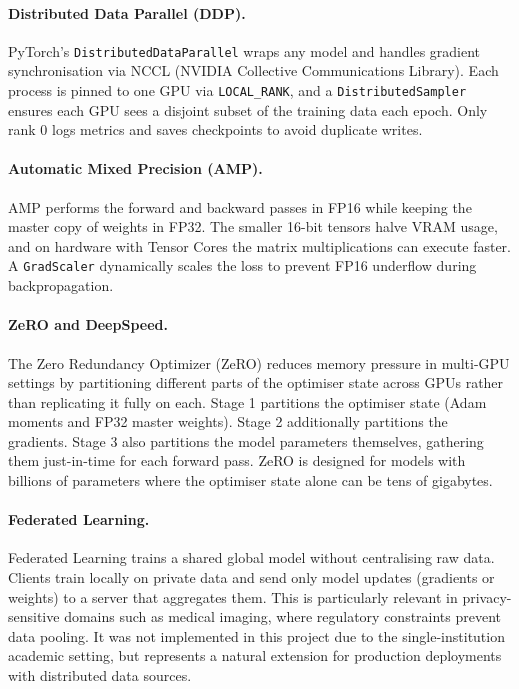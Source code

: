 \paragraph{Distributed Data Parallel (DDP).}
PyTorch's \texttt{DistributedDataParallel} wraps any model and handles
gradient synchronisation via NCCL (NVIDIA Collective Communications Library).
Each process is pinned to one GPU via \texttt{LOCAL\_RANK}, and a
\texttt{DistributedSampler} ensures each GPU sees a disjoint subset of the
training data each epoch. Only rank 0 logs metrics and saves checkpoints to
avoid duplicate writes.

\paragraph{Automatic Mixed Precision (AMP).}
AMP performs the forward and backward passes in FP16 while keeping the
master copy of weights in FP32. The smaller 16-bit tensors halve VRAM
usage, and on hardware with Tensor Cores the matrix multiplications can
execute faster. A \texttt{GradScaler} dynamically scales the loss to
prevent FP16 underflow during backpropagation.

\paragraph{ZeRO and DeepSpeed.}
The Zero Redundancy Optimizer (ZeRO) reduces memory pressure in multi-GPU
settings by partitioning different parts of the optimiser state across
GPUs rather than replicating it fully on each. Stage 1 partitions the
optimiser state (Adam moments and FP32 master weights). Stage 2 additionally
partitions the gradients. Stage 3 also partitions the model parameters
themselves, gathering them just-in-time for each forward pass.
ZeRO is designed for models with billions of parameters where the optimiser
state alone can be tens of gigabytes.

\paragraph{Federated Learning.}
Federated Learning trains a shared global model without centralising raw
data. Clients train locally on private data and send only model updates
(gradients or weights) to a server that aggregates them. This is
particularly relevant in privacy-sensitive domains such as medical imaging,
where regulatory constraints prevent data pooling. It was not implemented
in this project due to the single-institution academic setting, but
represents a natural extension for production deployments with
distributed data sources.

